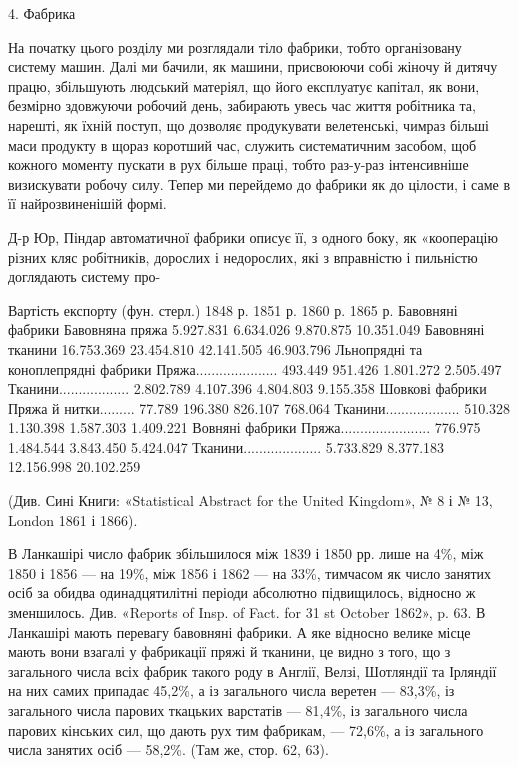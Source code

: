 4. Фабрика

На початку цього розділу ми розглядали тіло фабрики, тобто
організовану систему машин. Далі ми бачили, як машини, присвоюючи
собі жіночу й дитячу працю, збільшують людський
матеріял, що його експлуатує капітал, як вони, безмірно здовжуючи
робочий день, забирають увесь час життя робітника та,
нарешті, як їхній поступ, що дозволяє продукувати велетенські,
чимраз більші маси продукту в щораз коротший час, служить
систематичним засобом, щоб кожного моменту пускати в рух
більше праці, тобто раз-у-раз інтенсивніше визискувати робочу
силу. Тепер ми перейдемо до фабрики як до цілости, і саме в її
найрозвиненішій формі.

Д-р Юр, Піндар автоматичної фабрики описує її, з одного
боку, як «кооперацію різних кляс робітників, дорослих і недорослих,
які з вправністю і пильністю доглядають систему про-

                                                                            Вартість експорту (фун.
стерл.)
                                                       1848 р.                    1851 р.           
   1860 р.               1865 р.
Бавовняні фабрики
Бавовняна пряжа                  5.927.831                6.634.026             9.870.875        
10.351.049
Бавовняні тканини                 16.753.369           23.454.810        42.141.505         
46.903.796
Льнопрядні та коноплепрядні фабрики
Пряжа.....................                  493.449                 951.426             1.801.272   
       2.505.497
Тканини..................                 2.802.789             4.107.396             4.804.803     
    9.155.358
Шовкові фабрики
Пряжа й нитки.........                   77.789                 196.380              826.107        
     768.064
Тканини...................                 510.328               1.130.398          1.587.303       
    1.409.221
Вовняні фабрики
Пряжа.......................               776.975              1.484.544            3.843.450      
   5.424.047
Тканини....................               5.733.829             8.377.183           12.156.998      
 20.102.259

(Див. Сині Книги: «Statistical Abstract for the United Kingdom»,
№ 8 і № 13, London 1861 і 1866).

В Ланкашірі число фабрик збільшилося між 1839 і 1850 рр. лише на
4\%, між 1850 і 1856 — на 19\%, між 1856 і 1862 — на 33\%, тимчасом
як число занятих осіб за обидва одинадцятилітні періоди абсолютно підвищилось,
відносно ж зменшилось. Див. «Reports of Insp. of Fact. for
31 st October 1862», p. 63. В Ланкашірі мають перевагу бавовняні фабрики.
А яке відносно велике місце мають вони взагалі у фабрикації пряжі й
тканини, це видно з того, що з загального числа всіх фабрик такого роду
в Англії, Велзі, Шотляндії та Ірляндії на них самих припадає 45,2\%, а із
загального числа веретен — 83,3\%, із загального числа парових ткацьких
варстатів — 81,4\%, із загального числа парових кінських сил, що дають
рух тим фабрикам, — 72,6\%, а із загального числа занятих осіб — 58,2\%.
(Там же, стор. 62, 63).
